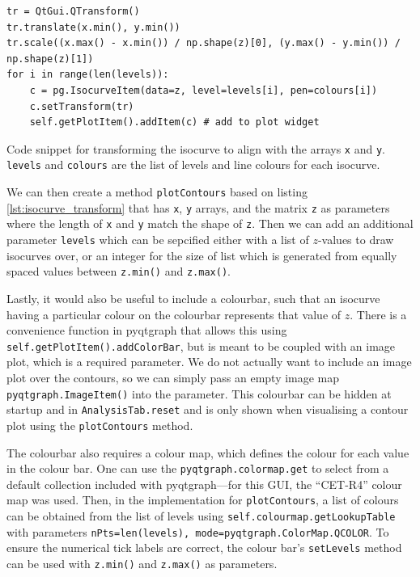 \documentclass[12pt]{article}
\newenvironment{code}{\captionsetup{type=listing}}{\par\addvspace{\baselineskip}}
\begin{document}
\begin{code}\begin{verbatim}
tr = QtGui.QTransform()
tr.translate(x.min(), y.min())
tr.scale((x.max() - x.min()) / np.shape(z)[0], (y.max() - y.min()) / np.shape(z)[1])
for i in range(len(levels)):
    c = pg.IsocurveItem(data=z, level=levels[i], pen=colours[i])
    c.setTransform(tr)
    self.getPlotItem().addItem(c) # add to plot widget
\end{verbatim}
\caption{Code snippet for transforming the isocurve to align with the arrays \texttt{x} and \texttt{y}. \texttt{levels} and \texttt{colours} are the list of levels and line colours for each isocurve.}
\label{lst:isocurve_transform}
\end{code}

We can then create a method \texttt{plotContours} based on listing \ref{lst:isocurve_transform} that has \texttt{x}, \texttt{y} arrays, and the matrix \texttt{z} as parameters where the length of \texttt{x} and \texttt{y} match the shape of \texttt{z}. Then we can add an additional parameter \texttt{levels} which can be sepcified either with a list of \(z\)-values to draw isocurves over, or an integer for the size of list which is generated from equally spaced values between \texttt{z.min()} and \texttt{z.max()}.

Lastly, it would also be useful to include a colourbar, such that an isocurve having a particular colour on the colourbar represents that value of \(z\). There is a convenience function in pyqtgraph that allows this using \texttt{self.getPlotItem().addColorBar}, but is meant to be coupled with an image plot, which is a required parameter. We do not actually want to include an image plot over the contours, so we can simply pass an empty image map \texttt{pyqtgraph.ImageItem()} into the parameter. This colourbar can be hidden at startup and in \texttt{AnalysisTab.reset} and is only shown when visualising a contour plot using the \texttt{plotContours} method.

The colourbar also requires a colour map, which defines the colour for each value in the colour bar. One can use the \texttt{pyqtgraph.colormap.get} to select from a default collection included with pyqtgraph---for this GUI, the ``CET-R4'' colour map was used. Then, in the implementation for \texttt{plotContours}, a list of colours can be obtained from the list of levels using \texttt{self.colourmap.getLookupTable} with parameters \texttt{nPts=len(levels), mode=pyqtgraph.ColorMap.QCOLOR}. To ensure the numerical tick labels are correct, the colour bar's \texttt{setLevels} method can be used with \texttt{z.min()} and \texttt{z.max()} as parameters.
\end{document}
